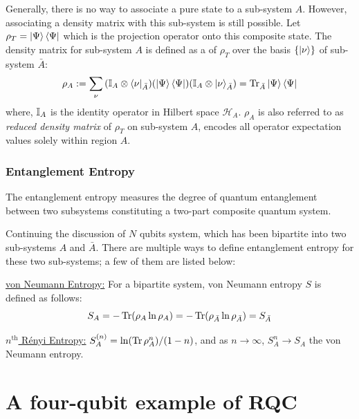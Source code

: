 \documentclass[11pt, oneside, listof=totoc]{scrbook}
\renewcommand{\H}{\mathcal{H}}
\begin{document}
Generally, there is no way to associate a pure state to a sub-system $A$. However, associating a density matrix with this sub-system is still possible. Let \(\rho_{T} = \ket{\Psi} \bra{\Psi}\) which is the projection operator onto this composite state. The density matrix for sub-system \(A\) is defined as a  of \(\rho_T\) over the basis \(\qty{\ket{\nu}}\) of sub-system \(\bar{A}\):
\begin{equation}
    \rho_A := \sum_{\nu} \qty(\mathbb{I}_{A} \otimes \bra{\nu}_{\bar{A}}) \qty(\ket{\Psi} \bra{\Psi}) \qty(\mathbb{I}_{A} \otimes \ket{\nu}_{\bar{A}}) = \Tr_{\bar{A}} \ket{\Psi} \bra{\Psi}
\end{equation}
where, \(\mathbb{I}_{A}\) is the identity operator in Hilbert space \(\H_A\). \(\rho_A\) is also referred to as \emph{reduced density matrix} of \(\rho_T\) on sub-system \(A\), encodes all operator expectation values solely within region $A$.

\subsubsection{Entanglement Entropy}

\begin{definition}
    The entanglement entropy measures the degree of quantum entanglement between two subsystems constituting a two-part composite quantum system.
\end{definition}
Continuing the discussion of \(N\) qubits system, which has been bipartite into two sub-systems \(A\) and \(\bar{A}\).
There are multiple ways to define entanglement entropy for these two sub-systems; a few of them are listed below:
\begin{list}{}{}
    \item[\uline{von Neumann Entropy:}] For a bipartite system, von Neumann entropy \(S\) is defined as follows:
        \begin{equation}
            S_{A} = - \Tr(\rho_{A} \ln \rho_{A}) = - \Tr(\rho_{\bar{A}} \ln \rho_{\bar{A}}) = S_{\bar{A}}
        \end{equation}

    \item[\uline{\(n^\text{th}\) R\'enyi Entropy:}] \(S_{A}^{(n)} = \ln(\Tr \rho_{A}^n) / (1 - n)\), and as \(n \to \infty\), \(S_A^n \to S_A\) \ie the von Neumann entropy.
\end{list}


\section{A four-qubit example of RQC}
\end{document}

